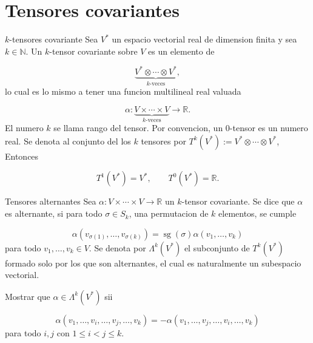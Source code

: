 \section{Tensores covariantes}
\begin{bookdefinition}{$k$-tensores covariante}
Sea $V^*$ un espacio vectorial real de dimension finita y sea $k\in\mathbb N$. Un $k$-tensor covariante sobre $V$ es un elemento de

\[
\underbrace{V^*\otimes\cdots\otimes V^*}_{k\text{-veces}},
\]
lo cual es lo mismo a tener una funcion multilineal real valuada

\[
\alpha:\underbrace{V\times\cdots\times V}_{k\text{-veces}}\to\mathbb R.
\]
El numero $k$ se llama rango del tensor. Por convencion, un $0$-tensor es un numero real. Se denota al conjunto del los $k$ tensores por $T^k(V^*):=V^*\otimes\cdots\otimes V^*$, Entonces

\[
T^1(V^*)=V^*,\qquad T^0(V^*)=\mathbb R.
\]
\end{bookdefinition}
\begin{bookdefinition}{Tensores alternantes}
Sea $\alpha:V\times\cdots\times V\to\mathbb R$ un $k$-tensor covariante. Se dice que $\alpha$ es alternante, si para todo $\sigma\in S_k$, una permutacion de $k$ elementos, se cumple

\[
\alpha(v_{\sigma(1)},\ldots,v_{\sigma(k)})=\operatorname{sg}(\sigma)\alpha(v_1,\ldots,v_k)
\]
para todo $v_1,\ldots,v_k\in V$. Se denota por $\Lambda^k(V^*)$ el subconjunto de $T^k(V^*)$ formado solo por los que son alternantes, el cual es naturalmente un subespacio vectorial.

\end{bookdefinition}
\begin{bookexercise}{}
Mostrar que $\alpha\in\Lambda^k(V^*)$ sii

\[
\alpha(v_1,\ldots,v_i,\ldots,v_j,\ldots,v_k)=-\alpha(v_1,\ldots,v_j,\ldots,v_i,\ldots,v_k)
\]
para todo $i,j$ con $1\le i<j\le k$.

\end{bookexercise}
